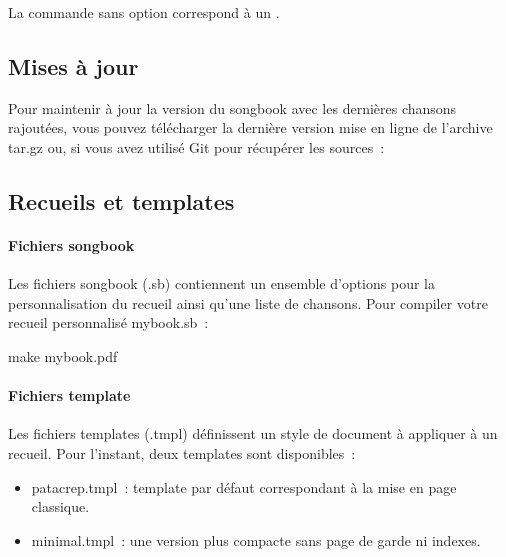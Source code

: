 \documentclass[online]{patacrep}
\begin{document}
\begin{nota}
  La commande  sans option correspond à un .
\end{nota}

\subsection{Mises à jour}

Pour maintenir à jour la version du songbook avec les dernières
chansons rajoutées, vous pouvez télécharger la dernière version mise
en ligne de l'archive tar.gz ou, si vous avez utilisé Git pour
récupérer les sources~:

\subsection{Recueils et templates}

\paragraph{Fichiers songbook}
Les fichiers songbook (.sb) contiennent un ensemble d'options pour la
personnalisation du recueil ainsi qu'une liste de chansons. Pour
compiler votre recueil personnalisé mybook.sb~:

\begin{unixcom}
  make mybook.pdf
\end{unixcom}

\paragraph{Fichiers template}
Les fichiers templates (.tmpl) définissent un style de document à
appliquer à un recueil. Pour l'instant, deux templates sont disponibles~:
\begin{itemize}
\item patacrep.tmpl~: template par défaut correspondant à la mise en page classique.
\item minimal.tmpl~: une version plus compacte sans page de garde ni indexes.
\end{itemize}
\end{document}
